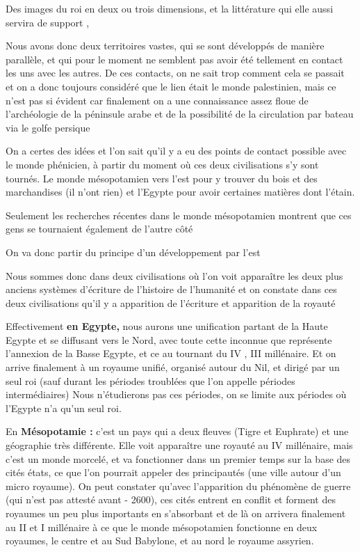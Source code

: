 \documentclass[a4paper,10pt]{article}
\begin{document}
Des  images du roi en deux ou trois dimensions, et la littérature qui
elle aussi servira de support , 

Nous avons donc deux territoires vastes, qui se sont développés de
manière parallèle, et qui pour le moment ne semblent pas avoir été
tellement en contact les uns avec les autres. De ces contacts, on ne
sait trop comment cela se passait et on a donc toujours considéré que
le lien était le monde palestinien, mais ce n'est pas
si évident car finalement on a une connaissance assez floue de
l'archéologie de la péninsule arabe et de la
possibilité de la circulation par bateau via le golfe persique

On a certes des idées et l'on sait
qu'il y a eu des points de contact possible avec le
monde phénicien, à partir du moment où ces deux civilisations
s'y sont tournés. Le monde mésopotamien vers
l'est pour y trouver du bois et des marchandises (il
n'ont rien) et l'Egypte pour avoir
certaines matières dont l'étain.

Seulement les recherches récentes dans le monde mésopotamien montrent
que ces gens se tournaient également de l'autre côté

On va donc partir du principe d'un développement par
l'est

Nous sommes donc dans deux civilisations où l'on voit
apparaître les deux plus anciens systèmes d'écriture
de l'histoire de l'humanité et on
constate dans ces deux civilisations  qu'il y a
apparition de l'écriture et apparition de la royauté

Effectivement \textbf{en Egypte,} nous aurons une unification partant de
la Haute Egypte et se diffusant vers le Nord, avec toute cette inconnue
que représente l'annexion de la Basse Egypte, et ce au
tournant du IV , III millénaire. Et on arrive finalement à un royaume
unifié, organisé autour du Nil, et dirigé par un seul roi (sauf durant
les périodes troublées que l'on appelle périodes
intermédiaires) Nous n'étudierons pas ces périodes, on
se limite aux périodes où l'Egypte
n'a qu'un seul roi.

En \textbf{Mésopotamie : }c'est un pays qui a deux
fleuves (Tigre et Euphrate) et une géographie très différente. Elle
voit apparaître une royauté au IV millénaire, mais
c'est un monde morcelé, et va fonctionner dans un
premier temps sur la base des cités états, ce que l'on
pourrait appeler des principautés (une ville autour
d'un micro royaume). On peut constater
qu'avec l'apparition du phénomène de
guerre (qui n'est pas attesté avant - 2600), ces cités
entrent en conflit et forment des royaumes un peu plus importants en
s'absorbant et de là on arrivera finalement au II et I
millénaire à ce que le monde mésopotamien fonctionne en deux royaumes,
le centre et au Sud  Babylone, et au nord le royaume assyrien.
\end{document}

